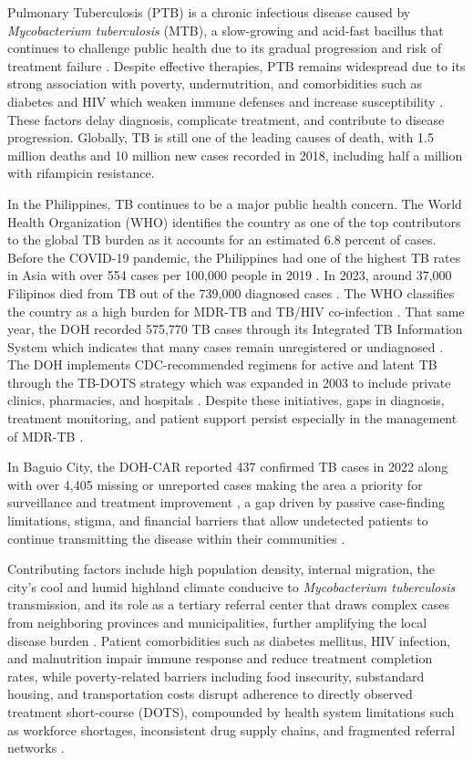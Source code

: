 \documentclass[12pt]{article}
\begin{document}
Pulmonary Tuberculosis (PTB) is a chronic infectious disease caused by \textit{Mycobacterium tuberculosis} (MTB), a slow-growing and acid-fast bacillus that continues to challenge public health due to its gradual progression and risk of treatment failure \citep{ref20}. Despite effective therapies, PTB remains widespread due to its strong association with poverty, undernutrition, and comorbidities such as diabetes and HIV which weaken immune defenses and increase susceptibility \citep{ref20}. These factors delay diagnosis, complicate treatment, and contribute to disease progression. Globally, TB is still one of the leading causes of death, with 1.5 million deaths and 10 million new cases recorded in 2018, including half a million with rifampicin resistance.

In the Philippines, TB continues to be a major public health concern. The World Health Organization (WHO) identifies the country as one of the top contributors to the global TB burden as it accounts for an estimated 6.8 percent of cases. Before the COVID-19 pandemic, the Philippines had one of the highest TB rates in Asia with over 554 cases per 100,000 people in 2019 \citep{ref8}. In 2023, around 37,000 Filipinos died from TB out of the 739,000 diagnosed cases \citep{who2023tb}. The WHO classifies the country as a high burden for MDR-TB and TB/HIV co-infection \citep{ref18}. That same year, the DOH recorded 575,770 TB cases through its Integrated TB Information System which indicates that many cases remain unregistered or undiagnosed \citep{ref4}. The DOH implements CDC-recommended regimens for active and latent TB through the TB-DOTS strategy which was expanded in 2003 to include private clinics, pharmacies, and hospitals \citep{ref5, ref6}. Despite these initiatives, gaps in diagnosis, treatment monitoring, and patient support persist especially in the management of MDR-TB \citep{ref29}.

In Baguio City, the DOH-CAR reported 437 confirmed TB cases in 2022 along with over 4,405 missing or unreported cases making the area a priority for surveillance and treatment improvement \citep{ref25}, a gap driven by passive case-finding limitations, stigma, and financial barriers that allow undetected patients to continue transmitting the disease within their communities \citep{ref26}. 

Contributing factors include high population density, internal migration, the city's cool and humid highland climate conducive to \textit{Mycobacterium tuberculosis} transmission, and its role as a tertiary referral center that draws complex cases from neighboring provinces and municipalities, further amplifying the local disease burden \citep{ref30}. Patient comorbidities such as diabetes mellitus, HIV infection, and malnutrition impair immune response and reduce treatment completion rates, while poverty-related barriers including food insecurity, substandard housing, and transportation costs disrupt adherence to directly observed treatment short-course (DOTS), compounded by health system limitations such as workforce shortages, inconsistent drug supply chains, and fragmented referral networks \citep{ref30,ref32,ref33,ref34}. 
\end{document}
